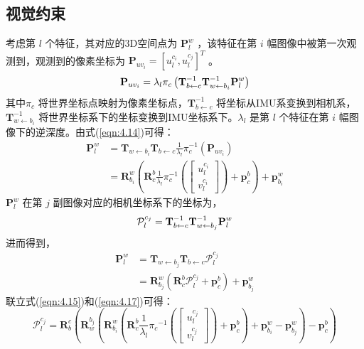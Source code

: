 \subsection{视觉约束}
考虑第  $l$ 个特征，其对应的3D空间点为 $\mathbf{P}_l^{w} $ ，该特征在第 $i$  幅图像中被第一次观测到，观测到的像素坐标为 $ \mathbf{P}_{uv_{i}} =[u_l^{c_i},u_l^{c_j}]^{T} $ 。
\begin{equation}
\label{eqn:4.14}
\setlength{\abovedisplayskip}{6pt}
\setlength{\belowdisplayskip}{6pt}
\mathbf{P}_{uv_{i}}  =\lambda_{l} \pi_{c}\left( \mathbf{T}_{b \leftarrow c}^{-1} \mathbf{T}_{w \leftarrow b_{i}}^{-1} \mathbf{P}^w_{l}\right)
\end{equation}
其中$\pi_{c} $ 将世界坐标点映射为像素坐标点，$\mathbf{T}_{b \leftarrow c}^{-1} $ 将坐标从IMU系变换到相机系，$\mathbf{T}_{w \leftarrow b_{i}}^{-1} $ 将世界坐标系下的坐标变换到IMU坐标系下。$\lambda_l $ 是第 $l$ 个特征在第 $i$ 幅图像下的逆深度。由式(\ref{eqn:4.14})可得：
\begin{equation}
\label{eqn:4.15}
\begin{aligned}
\mathbf{P}^w_{l} &= \mathbf{T}_{w\leftarrow b_{i}} \mathbf{T}_{b\leftarrow c} \frac{1}{\lambda_{l}} \pi_{c}^{-1}\left( \mathbf{P}_{uv_{i}} \right) \\
&= \mathbf{R}_{b_{i}}^{w}\left(\mathbf{R}_{c}^{b} \frac{1}{\lambda_{l}} \pi_{c}^{-1}
\left(\left[ \begin{array}
{c}{u_{l}^{c_{i}}} \\ {v_{l}^{c_{i}}}
\end{array}\right]\right)
+ \mathbf{p}_{c}^{b}\right)+\mathbf{p}_{b_{i}}^{w}
\end{aligned}
\end{equation}
 $\mathbf{P}_l^{w} $ 在第 $j$ 副图像对应的相机坐标系下的坐标为，
\begin{equation}
\label{eqn:4.16}
\setlength{\abovedisplayskip}{6pt}
\setlength{\belowdisplayskip}{6pt}
\mathcal{ P}_{l}^{c_{j}}=\mathbf{T}_{b \leftarrow c}^{-1} \mathbf{T}_{w \leftarrow b_{j}}^{-1} \mathbf{P}_{l}^{w}
\end{equation}
进而得到，
\begin{equation}
\label{eqn:4.17}
\begin{aligned}
\mathbf{ P}_{l}^{w} &= \mathbf{T}_{w \leftarrow b_{j}} \mathbf{T}_{b \leftarrow c} \mathcal{P}_{l}^{c_{j}} \\
&= \mathbf{R}_{b_{j}}^{w}\left(\mathbf{R}_{c}^{b} \mathcal{P}_{l}^{c_{j}}+\mathbf{p}_{c}^{b}\right)+\mathbf{p}_{b_{j}}^{w}
\end{aligned}
\end{equation}
联立式(\ref{eqn:4.15})和(\ref{eqn:4.17})可得：
\begin{equation}
\label{eqn:4.18}
\mathcal{P}_l^{c_j}=\mathbf{R}_b^c(\mathbf{R}_w^{b_j}(\mathbf{R}_{b_i}^w(\mathbf{R}_c^b\frac{1}{\lambda_l}{\pi_c}^{-1}(\begin{bmatrix}  u_l^{c_j} \\ v_l^{c_j}
\end{bmatrix})+\mathbf{p}_c^b)+\mathbf{p}_{b_i}^w-\mathbf{p}_{b_j}^w)-\mathbf{p}_c^b)
\end{equation}

